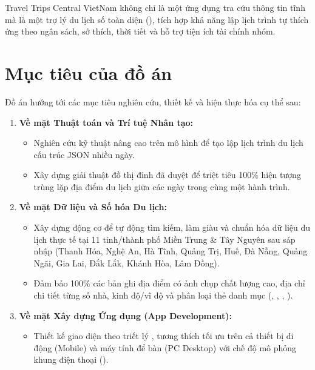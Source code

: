 \begin{ghinho}
Travel Trips Central VietNam không chỉ là một ứng dụng tra cứu thông tin tĩnh mà là một trợ lý du lịch số toàn diện (), tích hợp khả năng lập lịch trình tự thích ứng theo ngân sách, sở thích, thời tiết và hỗ trợ tiện ích tài chính nhóm.
\end{ghinho}

\section{Mục tiêu của đồ án}

Đồ án hướng tới các mục tiêu nghiên cứu, thiết kế và hiện thực hóa cụ thể sau:

\begin{enumerate}
    \item \textbf{Về mặt Thuật toán và Trí tuệ Nhân tạo:}
    \begin{itemize}
        \item Nghiên cứu kỹ thuật  nâng cao trên mô hình  để tạo lập lịch trình du lịch cấu trúc JSON nhiều ngày.
        \item Xây dựng giải thuật đồ thị đỉnh đã duyệt  để triệt tiêu 100\% hiện tượng trùng lặp địa điểm du lịch giữa các ngày trong cùng một hành trình.
    \end{itemize}
    \item \textbf{Về mặt Dữ liệu và Số hóa Du lịch:}
    \begin{itemize}
        \item Xây dựng động cơ  để tự động tìm kiếm, làm giàu và chuẩn hóa dữ liệu du lịch thực tế tại 11 tỉnh/thành phố Miền Trung \& Tây Nguyên sau sáp nhập (Thanh Hóa, Nghệ An, Hà Tĩnh, Quảng Trị, Huế, Đà Nẵng, Quảng Ngãi, Gia Lai, Đắk Lắk, Khánh Hòa, Lâm Đồng).
        \item Đảm bảo 100\% các bản ghi địa điểm có ảnh chụp chất lượng cao, địa chỉ chi tiết từng số nhà, kinh độ/vĩ độ và phân loại thẻ danh mục (, , , ).
    \end{itemize}
    \item \textbf{Về mặt Xây dựng Ứng dụng (App Development):}
    \begin{itemize}
        \item Thiết kế giao diện theo triết lý , tương thích tối ưu trên cả thiết bị di động (Mobile) và máy tính để bàn (PC Desktop) với chế độ mô phỏng khung điện thoại ().

\end{itemize}
\end{enumerate}
